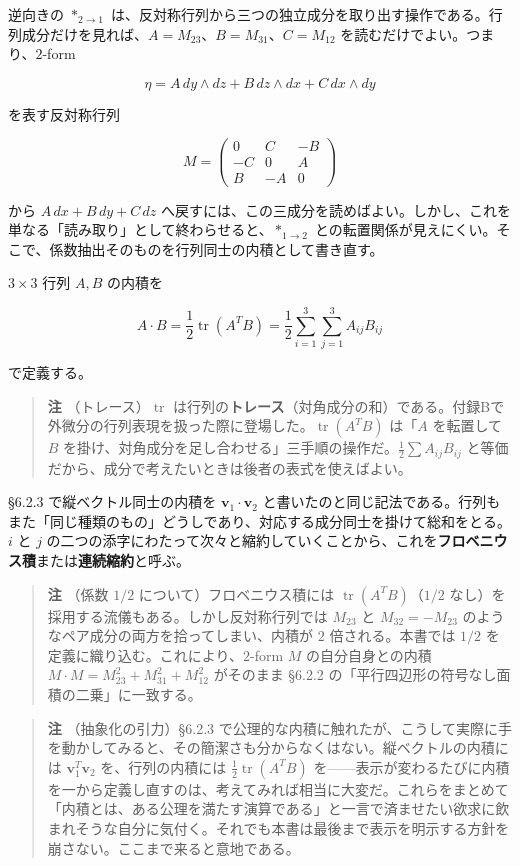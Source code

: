 \documentclass[a4paper,12pt,openany]{book}
\begin{document}
逆向きの \(\ast_{2\to1}\)
は、反対称行列から三つの独立成分を取り出す操作である。行列成分だけを見れば、\(A=M_{23}\)、\(B=M_{31}\)、\(C=M_{12}\)
を読むだけでよい。つまり、\(2\)-form

\[
\eta
=
A\,dy\wedge dz
+
B\,dz\wedge dx
+
C\,dx\wedge dy
\]

を表す反対称行列

\[
M=
\begin{pmatrix}
0 & C & -B \\
-C & 0 & A \\
B & -A & 0
\end{pmatrix}
\]

から \(A\,dx+B\,dy+C\,dz\)
へ戻すには、この三成分を読めばよい。しかし、これを単なる「読み取り」として終わらせると、\(\ast_{1\to2}\)
との転置関係が見えにくい。そこで、係数抽出そのものを行列同士の内積として書き直す。

\(3\times3\) 行列 \(A,B\) の内積を

\[
A\cdot B
=
\frac{1}{2}\operatorname{tr}(A^T B)
=
\frac{1}{2}
\sum_{i=1}^{3}
\sum_{j=1}^{3}
A_{ij}B_{ij}
\]

で定義する。

\begin{quote}
\textbf{注} （トレース）\(\operatorname{tr}\)
は行列の\textbf{トレース}（対角成分の和）である。付録Bで外微分の行列表現を扱った際に登場した。\(\operatorname{tr}(A^T B)\)
は「\(A\) を転置して \(B\)
を掛け、対角成分を足し合わせる」三手順の操作だ。\(\frac{1}{2}\sum A_{ij}B_{ij}\)
と等価だから、成分で考えたいときは後者の表式を使えばよい。
\end{quote}

§6.2.3 で縦ベクトル同士の内積を \(\mathbf{v}_1 \cdot \mathbf{v}_2\)
と書いたのと同じ記法である。行列もまた「同じ種類のもの」どうしであり、対応する成分同士を掛けて総和をとる。\(i\)
と \(j\)
の二つの添字にわたって次々と縮約していくことから、これを\textbf{フロベニウス積}または\textbf{連続縮約}と呼ぶ。

\begin{quote}
\textbf{注} （係数 \(1/2\) について）フロベニウス積には
\(\operatorname{tr}(A^T B)\)（\(1/2\)
なし）を採用する流儀もある。しかし反対称行列では \(M_{23}\) と
\(M_{32}=-M_{23}\) のようなペア成分の両方を拾ってしまい、内積が \(2\)
倍される。本書では \(1/2\) を定義に織り込む。これにより、\(2\)-form
\(M\) の自分自身との内積 \(M\cdot M=M_{23}^2+M_{31}^2+M_{12}^2\)
がそのまま §6.2.2 の「平行四辺形の符号なし面積の二乗」に一致する。
\end{quote}

\begin{quote}
\textbf{注} （抽象化の引力）§6.2.3
で公理的な内積に触れたが、こうして実際に手を動かしてみると、その簡潔さも分からなくはない。縦ベクトルの内積には
\(\mathbf{v}_1^T \mathbf{v}_2\) を、行列の内積には
\(\frac{1}{2}\operatorname{tr}(A^T B)\)
を——表示が変わるたびに内積を一から定義し直すのは、考えてみれば相当に大変だ。これらをまとめて「内積とは、ある公理を満たす演算である」と一言で済ませたい欲求に飲まれそうな自分に気付く。それでも本書は最後まで表示を明示する方針を崩さない。ここまで来ると意地である。
\end{quote}
\end{document}
